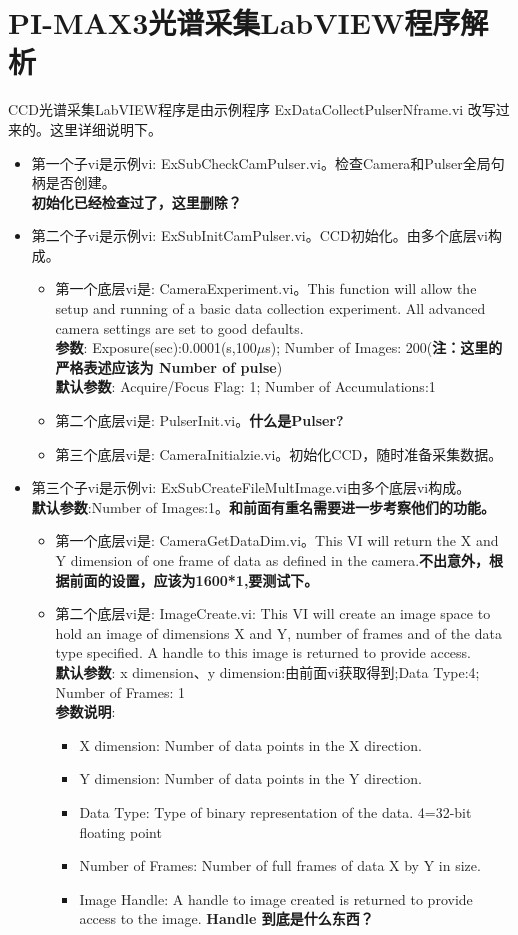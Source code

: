 \section{PI-MAX3光谱采集LabVIEW程序解析}
CCD光谱采集LabVIEW程序是由示例程序 ExDataCollectPulserNframe.vi 改写过来的。这里详细说明下。
\begin{itemize}
\item 第一个子vi是示例vi: ExSubCheckCamPulser.vi。检查Camera和Pulser全局句柄是否创建。
\\ \textbf{初始化已经检查过了，这里删除？}

\item 第二个子vi是示例vi: ExSubInitCamPulser.vi。CCD初始化。由多个底层vi构成。
\begin{itemize}
\item 第一个底层vi是: CameraExperiment.vi。This function will allow the setup and running
of a basic data collection experiment. All advanced camera settings are set to good defaults.
\\ \textbf{参数}: Exposure(sec):0.0001(s,100$\mu$s); Number of Images: 200(\textbf{注：这里的严格表述应该为 Number of pulse})
\\ \textbf{默认参数}: Acquire/Focus Flag: 1; Number of Accumulations:1
\item 第二个底层vi是: PulserInit.vi。\textbf{什么是Pulser?}
\item 第三个底层vi是: CameraInitialzie.vi。初始化CCD，随时准备采集数据。
\end{itemize}

\item 第三个子vi是示例vi: ExSubCreateFileMultImage.vi由多个底层vi构成。
\\ \textbf{默认参数}:Number of Images:1。\textbf{和前面有重名需要进一步考察他们的功能。} 
\begin{itemize}
\item 第一个底层vi是: CameraGetDataDim.vi。This VI will return the X and Y dimension of one frame of data as defined in the camera.\textbf{不出意外，根据前面的设置，应该为1600*1,要测试下。}
\item 第二个底层vi是: ImageCreate.vi: This VI will create an image space to hold an image
of dimensions X and Y, number of frames and of the data type specified. A handle to this 
image is returned to provide access.
\\ \textbf{默认参数}: x dimension、y dimension:由前面vi获取得到;Data Type:4; Number of Frames: 1
\\ \textbf{参数说明}:
\begin{itemize}
\item X dimension: Number of data points in the X direction.
\item Y dimension: Number of data points in the Y direction.
\item Data Type: Type of binary representation of the data. 4=32-bit floating point
\item Number of Frames: Number of full frames of data X by Y in size.
\item Image Handle: A handle to image created is returned to provide access to the image. \textbf{Handle 到底是什么东西？}
\end{itemize}



\end{itemize}
\end{itemize}

